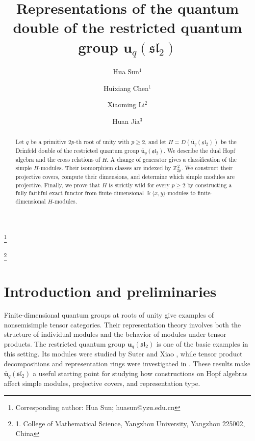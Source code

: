 \documentclass[10pt,oneside]{amsart}
\date{}
\newcommand{\uq}{\mathbf{\overline{u}}_q(\mathfrak{sl_2})}
\newcommand{\kk}{\Bbbk}
\theoremstyle{definition}
\newcommand{\selabel}[1]{\label{se:#1}}
\begin{document}
\title[Representations of the quantum double]{Representations of the quantum double of the restricted quantum group $\uq$}
\author{Hua Sun$^1$}
\address{College of Mathematical Science, Yangzhou University,
	Yangzhou 225002, China}
\author{Huixiang Chen$^1$}
\address{College of Mathematical Science, Yangzhou University,
	Yangzhou 225002, China}
\author{Xiaoming Li$^2$}
\address{School of Statistics and Data Science, Taizhou University,
	Taizhou 225300, China}
\author{Huan Jia$^3$}
\address{Department of Mathematics, Suqian University, Suqian 223800, China}



\thanks{Corresponding author: Hua Sun; huasun@yzu.edu.cn}


\thanks{1. College of Mathematical Science, Yangzhou University,
	Yangzhou 225002, China}


\begin{abstract}
Let $q$ be a primitive $2p$-th root of unity with $p\ge2$, and let $H=D(\uq)$ be the Drinfeld double of the restricted quantum group $\uq$. We describe the dual Hopf algebra and the cross relations of $H$. A change of generator gives a classification of the simple $H$-modules.  Their isomorphism classes are indexed by $\mathbb Z_{2p}^{\,2}$. We construct their projective covers, compute their dimensions, and determine which simple modules are projective. Finally, we prove that $H$ is strictly wild for every $p\ge2$ by constructing a fully faithful exact functor from finite-dimensional $\kk\langle x,y\rangle$-modules to finite-dimensional $H$-modules.
\end{abstract}
\maketitle

\section{Introduction and preliminaries}\selabel{1}
Finite-dimensional quantum groups at roots of unity give examples of nonsemisimple tensor categories. Their representation theory involves both the structure of individual modules and the behavior of modules under tensor products. The restricted quantum group $\uq$ is one of the basic examples in this setting. Its modules were studied by Suter and Xiao \cite{Suter,Xiao}, while tensor product decompositions and representation rings were investigated in \cite{KonSai,Su Yang}. These results make $\uq$ a useful starting point for studying how constructions on Hopf algebras affect simple modules, projective covers, and representation type.
\end{document}
